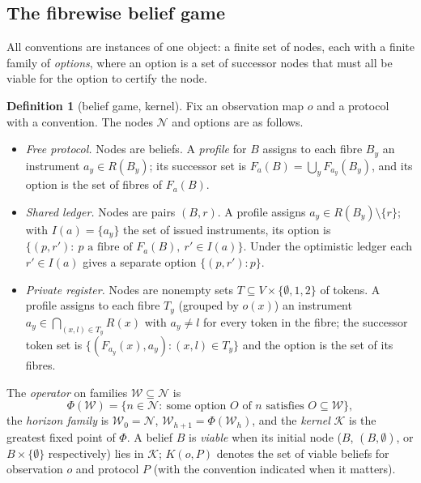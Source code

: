 \documentclass[11pt,a4paper]{article}
\theoremstyle{plain}
\theoremstyle{definition}
\newtheorem{definition}[theorem]{Definition}
\theoremstyle{remark}
\newcommand{\calK}{\mathcal{K}}
\newcommand{\calN}{\mathcal{N}}
\newcommand{\calW}{\mathcal{W}}
\begin{document}
\subsection{The fibrewise belief game}\label{sec:game}

All conventions are instances of one object: a finite set of nodes, each with a finite family of \emph{options}, where an option is a set of successor nodes that must all be viable for the option to certify the node.

\begin{definition}[belief game, kernel]\label{def:game}
Fix an observation map $o$ and a protocol with a convention. The nodes $\calN$ and options are as follows.
\begin{itemize}[leftmargin=2em,itemsep=1pt]
\item \emph{Free protocol.} Nodes are beliefs. A \emph{profile} for $B$ assigns to each fibre $B_y$ an instrument $a_y\in R(B_y)$; its successor set is $F_a(B)=\bigcup_y F_{a_y}(B_y)$, and its option is the set of fibres of $F_a(B)$.
\item \emph{Shared ledger.} Nodes are pairs $(B,r)$. A profile assigns $a_y\in R(B_y)\setminus\{r\}$; with $I(a)=\{a_y\}$ the set of issued instruments, its option is $\{(p,r'):\ p \text{ a fibre of } F_a(B),\ r'\in I(a)\}$. Under the optimistic ledger each $r'\in I(a)$ gives a separate option $\{(p,r'): p\}$.
\item \emph{Private register.} Nodes are nonempty sets $T\subseteq V\times\{\emptyset,1,2\}$ of tokens. A profile assigns to each fibre $T_y$ (grouped by $o(x)$) an instrument $a_y\in\bigcap_{(x,l)\in T_y}R(x)$ with $a_y\neq l$ for every token in the fibre; the successor token set is $\{(F_{a_y}(x),a_y):(x,l)\in T_y\}$ and the option is the set of its fibres.
\end{itemize}
The \emph{operator} on families $\calW\subseteq\calN$ is
\begin{equation}\label{eq:Phi}
\Phi(\calW)=\{n\in\calN:\ \text{some option } O \text{ of } n \text{ satisfies } O\subseteq\calW\},
\end{equation}
the \emph{horizon family} is $\calW_0=\calN$, $\calW_{h+1}=\Phi(\calW_h)$, and the \emph{kernel} $\calK$ is the greatest fixed point of $\Phi$. A belief $B$ is \emph{viable} when its initial node ($B$, $(B,\emptyset)$, or $B\times\{\emptyset\}$ respectively) lies in $\calK$; $K(o,P)$ denotes the set of viable beliefs for observation $o$ and protocol $P$ (with the convention indicated when it matters).
\end{definition}
\end{document}
